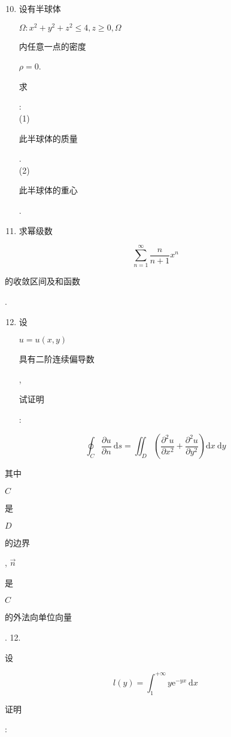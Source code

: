\documentclass[10pt]{article}
\begin{document}
\begin{enumerate}
  \setcounter{enumi}{9}
  \item \begin{CJK}{UTF8}{mj}设有半球体\end{CJK} $\Omega: x^{2}+y^{2}+z^{2} \leq 4, z \geq 0, \Omega$ \begin{CJK}{UTF8}{mj}内任意一点的密度\end{CJK} $\rho=0$. \begin{CJK}{UTF8}{mj}求\end{CJK}:\\
(1) \begin{CJK}{UTF8}{mj}此半球体的质量\end{CJK}.\\
(2) \begin{CJK}{UTF8}{mj}此半球体的重心\end{CJK}.

  \item \begin{CJK}{UTF8}{mj}求幂级数\end{CJK}

\end{enumerate}
$$
\sum_{n=1}^{\infty} \frac{n}{n+1} x^{n}
$$
\begin{CJK}{UTF8}{mj}的收敛区间及和函数\end{CJK}.

\begin{enumerate}
  \setcounter{enumi}{11}
  \item \begin{CJK}{UTF8}{mj}设\end{CJK} $u=u(x, y)$ \begin{CJK}{UTF8}{mj}具有二阶连续偏导数\end{CJK}, \begin{CJK}{UTF8}{mj}试证明\end{CJK}:
\end{enumerate}
$$
\oint_{C} \frac{\partial u}{\partial n} \mathrm{~d} s=\iint_{D}\left(\frac{\partial^{2} u}{\partial x^{2}}+\frac{\partial^{2} u}{\partial y^{2}}\right) \mathrm{d} x \mathrm{~d} y
$$
\begin{CJK}{UTF8}{mj}其中\end{CJK} $C$ \begin{CJK}{UTF8}{mj}是\end{CJK} $D$ \begin{CJK}{UTF8}{mj}的边界\end{CJK}, $\vec{n}$ \begin{CJK}{UTF8}{mj}是\end{CJK} $C$ \begin{CJK}{UTF8}{mj}的外法向单位向量\end{CJK}. 12. \begin{CJK}{UTF8}{mj}设\end{CJK}
$$
l(y)=\int_{1}^{+\infty} y \mathrm{e}^{-y x} \mathrm{~d} x
$$
\begin{CJK}{UTF8}{mj}证明\end{CJK}:
\end{document}
